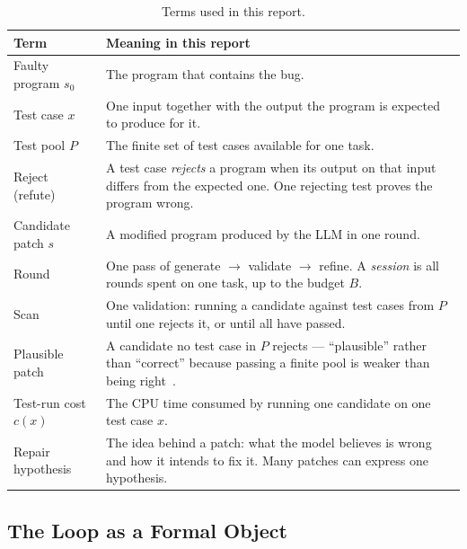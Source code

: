 \begin{table}[htbp]
\centering
\caption{Terms used in this report.}
\label{tab:terms}
\footnotesize
\begin{tabularx}{\textwidth}{@{}>{\raggedright\arraybackslash}p{} X@{}}
\toprule
Term & Meaning in this report\\
\midrule
Faulty program $s_0$ & The program that contains the bug.\\
Test case $x$ & One input together with the output the program is expected to produce for it.\\
Test pool $P$ & The finite set of test cases available for one task.\\
Reject (refute) & A test case \emph{rejects} a program when its output on that input differs from the expected one. One rejecting test proves the program wrong.\\
Candidate patch $s$ & A modified program produced by the LLM in one round.\\
Round & One pass of generate $\rightarrow$ validate $\rightarrow$ refine. A \emph{session} is all rounds spent on one task, up to the budget $B$.\\
Scan & One validation: running a candidate against test cases from $P$ until one rejects it, or until all have passed.\\
Plausible patch & A candidate no test case in $P$ rejects --- ``plausible'' rather than ``correct'' because passing a finite pool is weaker than being right~\citep{qi2015plausibility}.\\
Test-run cost $c(x)$ & The CPU time consumed by running one candidate on one test case $x$.\\
Repair hypothesis & The idea behind a patch: what the model believes is wrong and how it intends to fix it. Many patches can express one hypothesis.\\
\bottomrule
\end{tabularx}
\end{table}

\subsection{The Loop as a Formal Object}

